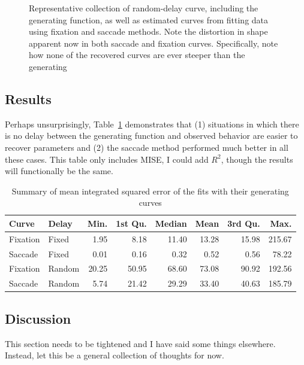 \documentclass{article}
\begin{document}
\begin{figure}[H]
\centering
\caption{Representative collection of random-delay curve, including  the generating function, as well as estimated curves from fitting data using fixation and saccade methods. Note the distortion in shape apparent now in both saccade and fixation curves. Specifically, note how none of the recovered curves are ever steeper than the generating}
\label{fig:random_pb_curves}
\end{figure}

\subsection{Results}

Perhaps unsurprisingly, Table~\ref{tab:mise_fixed_delay} demonstrates that (1) situations in which there is no delay between the generating function and observed behavior are easier to recover parameters and (2) the saccade method performed much better in all these cases. This table only includes MISE, I could add $R^2$, though the results will functionally be the same.

\begin{table}[ht]
\centering
\begin{tabular}{llrrrrrr}
  \hline
Curve & Delay & Min. & 1st Qu. & Median & Mean & 3rd Qu. & Max. \\ 
  \hline
Fixation & Fixed & 1.95 & 8.18 & 11.40 & 13.28 & 15.98 & 215.67 \\ 
  Saccade & Fixed & 0.01 & 0.16 & 0.32 & 0.52 & 0.56 & 78.22 \\ 
  Fixation & Random & 20.25 & 50.95 & 68.60 & 73.08 & 90.92 & 192.56 \\ 
  Saccade & Random & 5.74 & 21.42 & 29.29 & 33.40 & 40.63 & 185.79 \\ 
   \hline
\end{tabular}
\caption{Summary of mean integrated squared error of the fits with their generating curves}
\label{tab:mise_fixed_delay}
\end{table}

\subsection{Discussion}

This section needs to be tightened and I have said some things elsewhere. Instead, let this be a general collection of thoughts for now.
\end{document}
